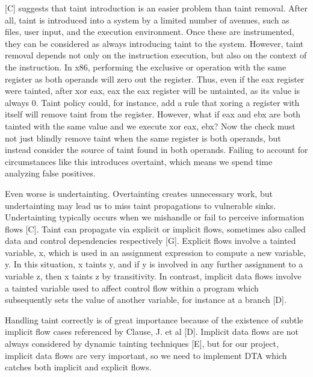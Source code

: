 \documentclass[11pt,expanded,copyright]{fsuthesis}
\begin{document}
[C] suggests that taint introduction is an easier problem than taint removal. After all, taint is introduced into a system by a limited number of avenues, such as files, user input, and the execution environment. Once these are instrumented, they can be considered as always introducing taint to the system. However, taint removal depends not only on the instruction execution, but also on the context of the instruction. In x86, performing the exclusive or operation with the same register as both operands will zero out the register. Thus, even if the eax register were tainted, after xor eax, eax the eax register will be untainted, as its value is always 0. Taint policy could, for instance, add a rule that xoring a register with itself will remove taint from the register. However, what if eax and ebx are both tainted with the same value and we execute xor eax, ebx? Now the check must not just blindly remove taint when the same register is both operands, but instead consider the source of taint found in both operands. Failing to account for circumstances like this introduces overtaint, which means we spend time analyzing false positives. 

Even worse is undertainting. Overtainting creates unnecessary work, but undertainting may lead us to miss taint propagations to vulnerable sinks. Undertainting typically occurs when we mishandle or fail to perceive information flows [C]. Taint can propagate via explicit or implicit flows, sometimes also called data and control dependencies respectively [G]. Explicit flows involve a tainted variable, x, which is used in an assignment expression to compute a new variable, y. In this situation, x taints y, and if y is involved in any further assignment to a variable z, then x taints z by transitivity. In contrast, implicit data flows involve a tainted variable used to affect control flow within a program which subsequently sets the value of another variable, for instance at a branch [D]. 

Handling taint correctly is of great importance because of the existence of subtle implicit flow cases referenced by Clause, J. et al [D]. Implicit data flows are not always considered by dynamic tainting techniques [E], but for our project, implicit data flows are very important, so we need to implement DTA which catches both implicit and explicit flows.


\end{document}
